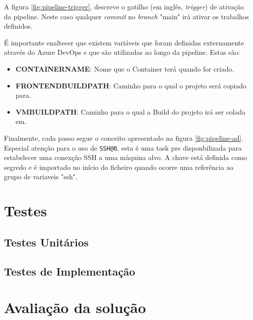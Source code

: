 A figura \ref{fig:pipeline-trigger}, descreve o gatilho (em inglês, \textit{trigger}) de ativação da pipeline. Neste caso qualquer \textit{commit} no \textit{branch} "main" irá ativar os trabalhos definidos.

É importante enaltecer que existem variáveis que foram definidas externamente através do Azure DevOps e que são utilizadas ao longo da pipeline. Estas são:

\begin{itemize}
    \item \textbf{CONTAINERNAME}: Nome que o \gls{Container} terá quando for criado.
    \item \textbf{FRONTENDBUILDPATH}: Caminho para o qual o projeto será copiado para.
    \item \textbf{VMBUILDPATH}: Caminho para o qual a \gls{Build} do projeto irá ser colada em.
\end{itemize}

Finalmente, cada passo segue o conceito apresentado na figura \ref{fig:pipeline-ad}. Especial atenção para o uso de \lstinline|SSH@0|\cite{docs-SSH@0}, esta é uma task pre disponbilizada para estabelecer uma conexção SSH a uma màquina alvo. A chave está definida como segredo e é importado no início do ficheiro quando ocorre uma referência ao grupo de variaveis "ssh".

\section{Testes}

\subsection{Testes Unitários}

\subsection{Testes de Implementação}

\section{Avaliação da solução}